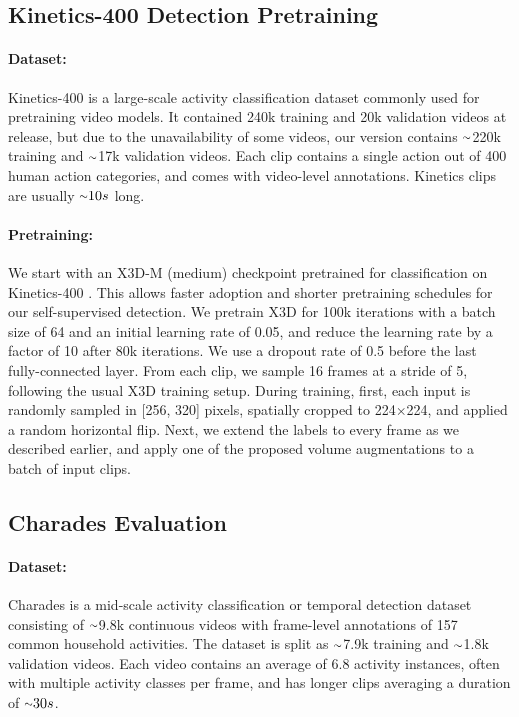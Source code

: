 \documentclass[10pt,twocolumn,letterpaper]{article}
\newcommand{\app}{\raise.17ex\hbox{$\scriptstyle\sim$}}
\begin{document}
\vspace{-1mm}
\subsection{Kinetics-400 Detection Pretraining}
\vspace{-1mm}

\paragraph{Dataset:} Kinetics-400 \cite{carreira2017quo} is a large-scale activity classification dataset commonly used for pretraining video models. It contained 240k training and 20k validation videos at release, but due to the unavailability of some videos, our version contains $\app$220k training and $\app$17k validation videos. Each clip contains a single action out of 400 human action categories, and comes with video-level annotations. Kinetics clips are usually $\app10s$ long.

\paragraph{Pretraining:} We start with an X3D-M (medium) \cite{feichtenhofer2020x3d} checkpoint pretrained for classification on Kinetics-400 \cite{carreira2017quo}. This allows faster adoption and shorter pretraining schedules for our self-supervised detection. We pretrain X3D for 100k iterations with a batch size of 64 and an initial learning rate of 0.05, and reduce the learning rate by a factor of 10 after 80k iterations. We use a dropout rate of 0.5 before the last fully-connected layer. From each clip, we sample 16 frames at a stride of 5, following the usual X3D training setup. During training, first, each input is randomly sampled in [256, 320] pixels, spatially cropped to 224$\times$224, and applied a random horizontal flip. Next, we extend the labels to every frame as we described earlier, and apply one of the proposed volume augmentations to a batch of input clips.

\vspace{-2mm}
\subsection{Charades Evaluation}
\label{subsec:charades}

\paragraph{Dataset:} Charades \cite{sigurdsson2016hollywood} is a mid-scale activity classification or temporal detection dataset consisting of $\app$9.8k continuous videos with frame-level annotations of 157 common household activities. The dataset is split as $\app$7.9k training and $\app$1.8k validation videos. Each video contains an average of 6.8 activity instances, often with multiple activity classes per frame, and has longer clips averaging a duration of $\app30s$.
\end{document}
